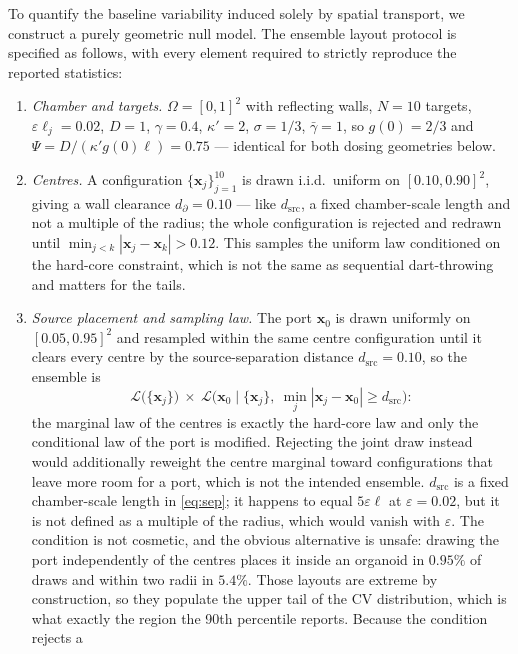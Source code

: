\documentclass[pdflatex,sn-mathphys-num]{sn-jnl}
\numberwithin{equation}{section}
\theoremstyle{thmstyleone}%
\theoremstyle{definition}
\theoremstyle{remark}
\begin{document}
To quantify the baseline variability induced solely by spatial transport, we construct a purely geometric null model. The ensemble layout protocol is specified as follows, with every element required to strictly reproduce the reported statistics:
\begin{enumerate}[label=(\roman*)]
\item \emph{Chamber and targets.} $\Omega=[0,1]^2$ with reflecting walls,
$N=10$ targets, $\varepsilon\ell_j=0.02$, $D=1$, $\gamma=0.4$, $\kappa'=2$,
$\sigma=1/3$, $\bar\gamma=1$, so $g(0)=2/3$ and
$\Psi=D/(\kappa'g(0)\ell)=0.75$ --- identical for both dosing
geometries below.
\item \emph{Centres.} A configuration $\{\mathbf x_j\}_{j=1}^{10}$ is drawn
i.i.d.\ uniform on $[0.10,0.90]^2$, giving a wall clearance
$d_\partial=0.10$ --- like $d_{\mathrm{src}}$, a fixed chamber-scale length and
not a multiple of the radius; the whole configuration is rejected and
redrawn until
$\min_{j<k}|\mathbf x_j-\mathbf x_k|>0.12$. This samples the uniform law
conditioned on the hard-core constraint, which is not the same as sequential
dart-throwing and matters for the tails.
\item \emph{Source placement and sampling law.} The port $\mathbf x_0$ is drawn uniformly on
$[0.05,0.95]^2$ and resampled within the same centre configuration until
it clears every centre by the source-separation distance
$d_{\mathrm{src}}=0.10$, so the ensemble is
\begin{equation}
\mathcal L\bigl(\{\mathbf x_j\}\bigr)\ \times\
\mathcal L\bigl(\mathbf x_0\mid\{\mathbf x_j\},\
\min_j|\mathbf x_j-\mathbf x_0|\ge d_{\mathrm{src}}\bigr):
\label{eq:ensemblelaw}
\end{equation}
the marginal law of the centres is exactly the hard-core law and only the
conditional law of the port is modified. Rejecting the joint draw instead would
additionally reweight the centre marginal toward configurations that leave more
room for a port, which is not the intended ensemble. $d_{\mathrm{src}}$ is a fixed chamber-scale length in
\eqref{eq:sep}; it happens to equal $5\varepsilon\ell$ at $\varepsilon=0.02$,
but it is not defined as a multiple of the radius, which would vanish
with $\varepsilon$.
The condition is not cosmetic, and the obvious alternative is unsafe: drawing
the port independently of the centres places it inside an organoid in
$0.95\%$ of draws and within two radii in $5.4\%$. Those layouts are extreme by
construction, so they populate the upper tail of the CV distribution, which is what exactly
the region the 90th percentile reports. Because the condition rejects a

\end{enumerate}
\end{document}
